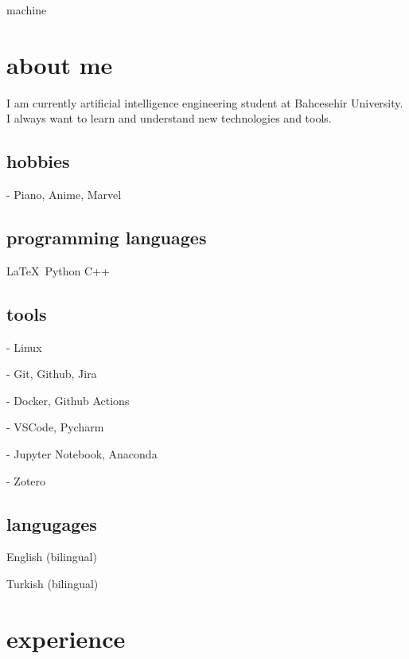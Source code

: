 \documentclass{resume-class} %
\begin{document}
\makeprofile

machine
\drawsidebar
\section{about me}

I am currently artificial intelligence engineering student at Bahcesehir University. I always want to learn and understand new technologies and tools.

\subsection{hobbies}

- Piano, Anime, Marvel


\subsection{programming languages}

\LaTeX\ Python C++

\subsection{tools}
- Linux

- Git, Github, Jira

- Docker, Github Actions

- VSCode, Pycharm

- Jupyter Notebook, Anaconda

- Zotero

\subsection{langugages}

English (bilingual)

Turkish (bilingual)


\section{experience}
\blindtext
\end{document}
